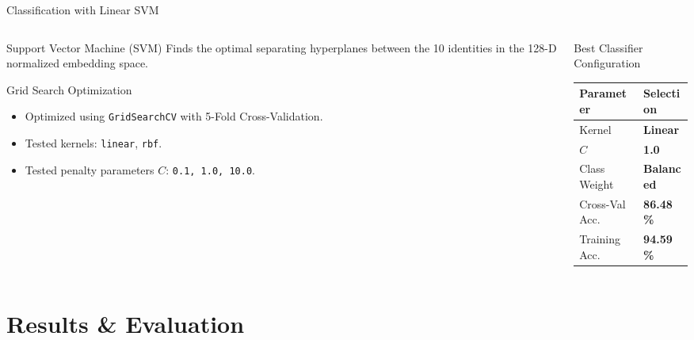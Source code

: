 \documentclass[aspectratio=169]{beamer}
\begin{document}
\begin{frame}{Classification with Linear SVM}
  \begin{columns}
    \begin{column}{0.5\textwidth}
      \begin{block}{Support Vector Machine (SVM)}
        Finds the optimal separating hyperplanes between the 10 identities in the 128-D normalized embedding space.
      \end{block}
      \begin{block}{Grid Search Optimization}
        \begin{itemize}
          \item Optimized using \texttt{GridSearchCV} with 5-Fold Cross-Validation.
          \item Tested kernels: \texttt{linear}, \texttt{rbf}.
          \item Tested penalty parameters $C$: \texttt{0.1, 1.0, 10.0}.
        \end{itemize}
      \end{block}
    \end{column}
    \begin{column}{0.5\textwidth}
      \begin{block}{Best Classifier Configuration}
        \begin{tabular}{ll}
          \toprule
          \textbf{Parameter} & \textbf{Selection}\\
          \midrule
          Kernel & \textbf{Linear}\\
          $C$ & \textbf{1.0}\\
          Class Weight & \textbf{Balanced}\\
          Cross-Val Acc. & \textbf{86.48\%}\\
          Training Acc. & \textbf{94.59\%}\\
          \bottomrule
        \end{tabular}
      \end{block}
    \end{column}
  \end{columns}
\end{frame}

\section{Results \& Evaluation}
\end{document}
